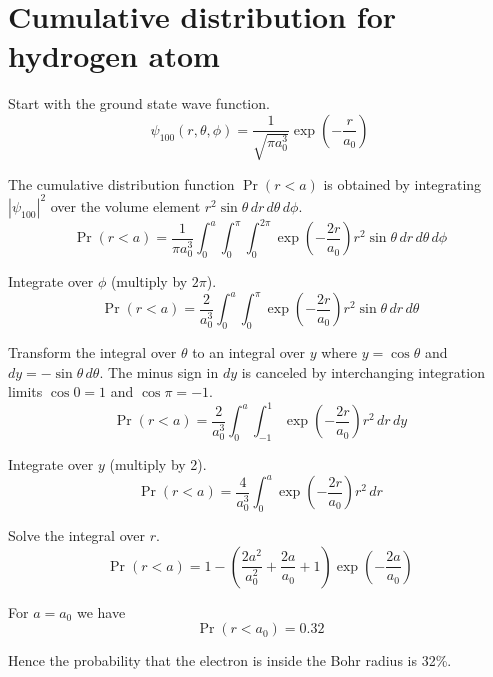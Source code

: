 

\section*{Cumulative distribution for hydrogen atom}

Start with the ground state wave function.
\begin{equation*}
\psi_{100}(r,\theta,\phi)=\frac{1}{\sqrt{\pi a_0^3}}\exp\left(-\frac{r}{a_0}\right)
\end{equation*}

The cumulative distribution function $\Pr(r<a)$ is obtained by integrating
$|\psi_{100}|^2$ over the volume element $r^2\sin\theta\,dr\,d\theta\,d\phi$.
\begin{equation*}
\Pr(r<a)=\frac{1}{\pi a_0^3}
\int_0^a\int_0^\pi\int_0^{2\pi}\exp\left(-\frac{2r}{a_0}\right)
r^2\sin\theta\,dr\,d\theta\,d\phi
\end{equation*}

Integrate over $\phi$ (multiply by $2\pi$).
\begin{equation*}
\Pr(r<a)=\frac{2}{a_0^3}
\int_0^a\int_0^\pi\exp\left(-\frac{2r}{a_0}\right)r^2\sin\theta\,dr\,d\theta
\end{equation*}

Transform the integral over $\theta$ to an integral over $y$ where
$y=\cos\theta$ and $dy=-\sin\theta\,d\theta$.
The minus sign in $dy$ is canceled by interchanging integration limits
$\cos0=1$ and $\cos\pi=-1$.
\begin{equation*}
\Pr(r<a)=\frac{2}{a_0^3}
\int_0^a\int_{-1}^1\exp\left(-\frac{2r}{a_0}\right)r^2\,dr\,dy
\end{equation*}

Integrate over $y$ (multiply by 2).
\begin{equation*}
\Pr(r<a)=\frac{4}{a_0^3}
\int_0^a\exp\left(-\frac{2r}{a_0}\right)r^2\,dr
\end{equation*}

Solve the integral over $r$.
\begin{equation*}
\Pr(r<a)=1-\left(\frac{2a^2}{a_0^2}+\frac{2a}{a_0}+1\right)
\exp\left(-\frac{2a}{a_0}\right)
\tag{1}
\end{equation*}

For $a=a_0$ we have
\begin{equation*}
\Pr(r<a_0)=0.32
\end{equation*}

Hence the probability that the electron is inside the Bohr radius is 32\%.

